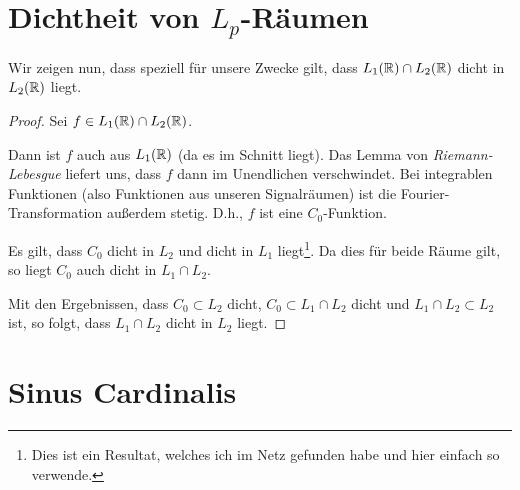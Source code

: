 
\section{Dichtheit von $L_p$-Räumen}\label{seq:densityoflebesguespaces}
Wir zeigen nun, dass speziell für unsere Zwecke gilt, dass
$ L_1(\mathbb{R}) \cap L_2(\mathbb{R}) $ dicht in $L_2(\mathbb{R})$ liegt.

\begin{proof}
Sei $f\in L_1(\mathbb{R}) \cap L_2(\mathbb{R})$.

Dann ist $f$ auch aus $L_1(\mathbb{R})$ (da es im Schnitt liegt). Das Lemma von
\emph{Riemann-Lebesgue} liefert uns, dass $f$ dann im Unendlichen verschwindet. Bei
integrablen Funktionen (also Funktionen aus unseren Signalräumen) ist die Fourier-Transformation
außerdem stetig. D.h., $f$ ist eine $C_0$-Funktion.

Es gilt, dass $C_0$ dicht in $L_2$ und dicht in $L_1$ liegt\footnote{Dies ist ein Resultat, welches
ich im Netz gefunden habe und hier einfach so verwende.}. Da dies für beide Räume gilt, so liegt
$C_0$ auch dicht in $L_1 \cap L_2$.

Mit den Ergebnissen, dass $C_0 \subset L_2$ dicht, $C_0 \subset L_1 \cap L_2$ dicht und 
$L_1 \cap L_2 \subset L_2$ ist, so folgt, dass $L_1 \cap L_2$ dicht in $L_2$ liegt.
\end{proof}

\section{Sinus Cardinalis}\label{sec:sincproofs}

